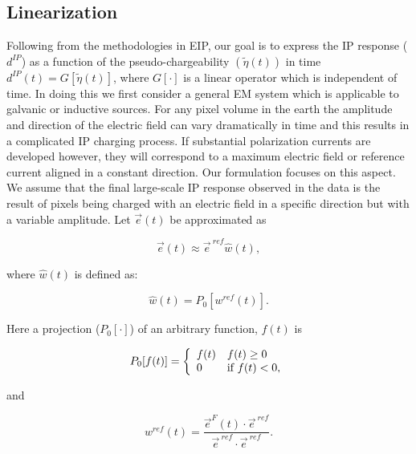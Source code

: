 \documentclass[letterpaper,11pt]{article}
\newcommand {\e}  { {\vec e} }
\newcommand{\peta}{\tilde{\eta}}
\newcommand{\eref}{\e^{\ ref}}
\newcommand{\dip}{d^{IP}}
\begin{document}
\subsection{Linearization}
\label{appendix: linearization}
Following from the methodologies in EIP, our goal is to express the IP response ($\dip$) as a function of the pseudo-chargeability $(\peta(t))$ in time  $\dip(t) = G[\peta(t)]$, where $G[\cdot]$ is a linear operator which is independent of time. In doing this we first consider a general EM system which is applicable to galvanic or inductive sources. 
For any pixel  volume in the earth the amplitude and direction of the  electric field can vary dramatically  in time and this results in a complicated  IP charging process. If substantial polarization currents are developed however, they will correspond to a maximum electric field or reference current aligned in a constant direction. Our formulation focuses on this aspect. We assume that the final large-scale IP response observed in the data is the result of  pixels being charged with an electric field in a specific direction but with a variable amplitude. Let $\e(t)$ be approximated as
\begin{linenomath*}
\begin{equation}
  \e(t) \approx \eref \hat{w}(t),
  \label{eq: e_with_eref}
\end{equation}
\end{linenomath*}
where $\hat{w}(t)$ is defined as:
\begin{linenomath*}
\begin{equation}
  \hat{w}(t) = P_0[w^{ref}(t)].
  \label{eq: we}
\end{equation}
\end{linenomath*}
Here a projection ($P_0[\cdot]$) of an arbitrary function, $f(t)$ is
\begin{linenomath*}
\begin{equation}
  P_0[f(t)] = \left\{ 
  \begin{array}{l l}
    f(t) & f(t) \ge 0 \\
    0 & \text{if } f(t) < 0, 
  \end{array}\right.
  \label{eq: P0}
\end{equation}
\end{linenomath*}
and
\begin{linenomath*}
\begin{equation}
  w^{ref}(t) = \frac{\e^F(t)\cdot\eref}{\eref\cdot\eref}.
  \label{eq: wref}
\end{equation}
\end{linenomath*}
\end{document}
